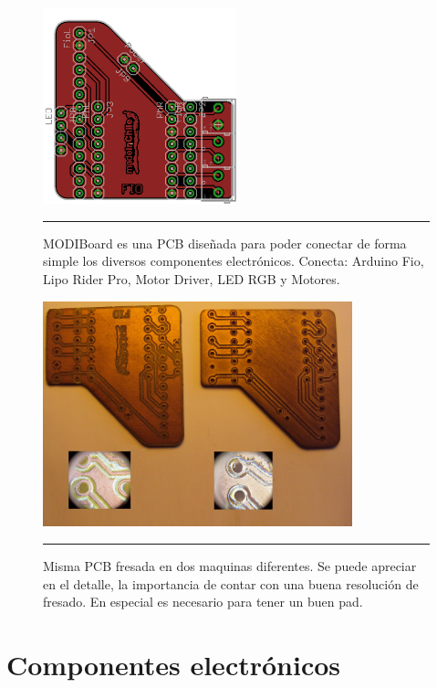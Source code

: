 \begin{figure}[htbp]
	\centering
		\includegraphics[width=0.5\textwidth]{./Figures/MODI/pcbmodi.png}
		\rule{35em}{0.5pt}
	\caption[pcbeagle]{MODIBoard es una PCB diseñada para poder conectar de forma simple los diversos componentes electrónicos. Conecta: Arduino Fio, Lipo Rider Pro, Motor Driver, LED RGB y Motores.}
	\label{fig:pcbeagle}
\end{figure}

\begin{figure}[htbp]
	\centering
		\includegraphics[width=0.8\textwidth]{./Pictures/pcb.jpg}
		\rule{35em}{0.5pt}
	\caption[pcb]{Misma PCB fresada en dos maquinas diferentes. Se puede apreciar en el detalle, la importancia de contar con una buena resolución de fresado. En especial es necesario para tener un buen pad.}
	\label{fig:pcb}
\end{figure}

\section{Componentes electrónicos}

